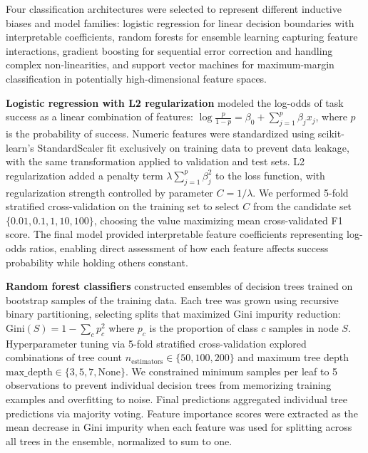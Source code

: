 \documentclass[]{article}
\begin{document}
Four classification architectures were selected to represent different inductive biases and model families: logistic regression for linear decision boundaries with interpretable coefficients, random forests for ensemble learning capturing feature interactions, gradient boosting for sequential error correction and handling complex non-linearities, and support vector machines for maximum-margin classification in potentially high-dimensional feature spaces.

\textbf{Logistic regression with L2 regularization} modeled the log-odds of task success as a linear combination of features: $\log\frac{p}{1-p} = \beta_0 + \sum_{j=1}^{p} \beta_j x_j$, where $p$ is the probability of success. Numeric features were standardized using scikit-learn's StandardScaler fit exclusively on training data to prevent data leakage, with the same transformation applied to validation and test sets. L2 regularization added a penalty term $\lambda \sum_{j=1}^{p} \beta_j^2$ to the loss function, with regularization strength controlled by parameter $C = 1/\lambda$. We performed 5-fold stratified cross-validation on the training set to select $C$ from the candidate set $\{0.01, 0.1, 1, 10, 100\}$, choosing the value maximizing mean cross-validated F1 score. The final model provided interpretable feature coefficients representing log-odds ratios, enabling direct assessment of how each feature affects success probability while holding others constant.

\textbf{Random forest classifiers} constructed ensembles of decision trees trained on bootstrap samples of the training data. Each tree was grown using recursive binary partitioning, selecting splits that maximized Gini impurity reduction: $\text{Gini}(S) = 1 - \sum_{c} p_c^2$ where $p_c$ is the proportion of class $c$ samples in node $S$. Hyperparameter tuning via 5-fold stratified cross-validation explored combinations of tree count $n_{\text{estimators}} \in \{50, 100, 200\}$ and maximum tree depth $\text{max\_depth} \in \{3, 5, 7, \text{None}\}$. We constrained minimum samples per leaf to 5 observations to prevent individual decision trees from memorizing training examples and overfitting to noise. Final predictions aggregated individual tree predictions via majority voting. Feature importance scores were extracted as the mean decrease in Gini impurity when each feature was used for splitting across all trees in the ensemble, normalized to sum to one.
\end{document}

